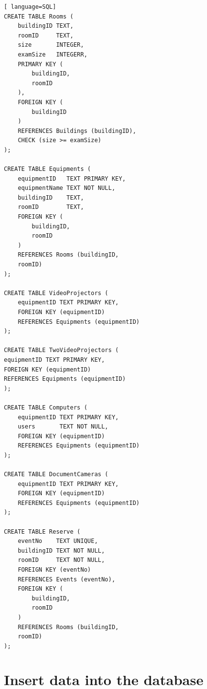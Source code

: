\documentclass{article}
\begin{document}
\begin{lstlisting}[ language=SQL]
CREATE TABLE Rooms (
	buildingID TEXT,
	roomID     TEXT,
	size       INTEGER,
	examSize   INTEGERR,
	PRIMARY KEY (
		buildingID,
		roomID
	),
	FOREIGN KEY (
		buildingID
	)
	REFERENCES Buildings (buildingID),
	CHECK (size >= examSize) 
);

CREATE TABLE Equipments (
	equipmentID   TEXT PRIMARY KEY,
	equipmentName TEXT NOT NULL,
	buildingID    TEXT,
	roomID        TEXT,
	FOREIGN KEY (
		buildingID,
		roomID
	)
	REFERENCES Rooms (buildingID,
	roomID) 
);

CREATE TABLE VideoProjectors (
	equipmentID TEXT PRIMARY KEY,
	FOREIGN KEY (equipmentID)
	REFERENCES Equipments (equipmentID) 
);

CREATE TABLE TwoVideoProjectors (
equipmentID TEXT PRIMARY KEY,
FOREIGN KEY (equipmentID)
REFERENCES Equipments (equipmentID) 
);

CREATE TABLE Computers (
	equipmentID TEXT PRIMARY KEY,
	users       TEXT NOT NULL,
	FOREIGN KEY (equipmentID)
	REFERENCES Equipments (equipmentID) 
);

CREATE TABLE DocumentCameras (
	equipmentID TEXT PRIMARY KEY,
	FOREIGN KEY (equipmentID)
	REFERENCES Equipments (equipmentID) 
);

CREATE TABLE Reserve (
	eventNo    TEXT UNIQUE,
	buildingID TEXT NOT NULL,
	roomID     TEXT NOT NULL,
	FOREIGN KEY (eventNo)
	REFERENCES Events (eventNo),
	FOREIGN KEY (
		buildingID,
		roomID
	)
	REFERENCES Rooms (buildingID,
	roomID) 
);
\end{lstlisting}

\section{Insert data into the database}
\end{document}
